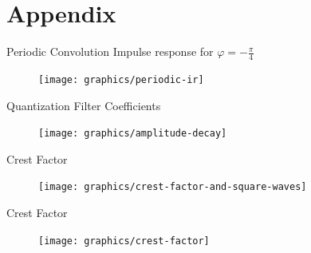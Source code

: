 \documentclass[mathserif]{intbeamer}
\begin{document}
\section{Appendix}
%
%
%
\begin{frame}[noframenumbering]{Periodic Convolution}
Impulse response for $\varphi=-\frac{\pi}{4}$
\begin{figure}
\texttt{[image: graphics/periodic-ir]}
\end{figure}
\end{frame}
%
%
%
\begin{frame}[noframenumbering]{Quantization Filter Coefficients}
\begin{figure}
\texttt{[image: graphics/amplitude-decay]}
\end{figure}
\end{frame}
%
%
%
\begin{frame}[noframenumbering]{Crest Factor}
\begin{figure}
\texttt{[image: graphics/crest-factor-and-square-waves]}
\end{figure}
\end{frame}
%
%
%
\begin{frame}[noframenumbering]{Crest Factor}
\begin{figure}
\texttt{[image: graphics/crest-factor]}
\end{figure}
\end{frame}
%
%
%
\end{document}
